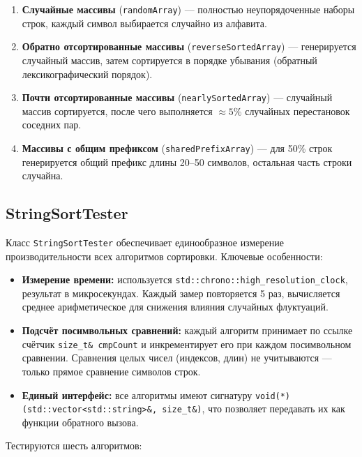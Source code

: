 \documentclass[12pt,a4paper]{article}
\begin{document}
\begin{enumerate}
    \item \textbf{Случайные массивы} (\texttt{randomArray}) — полностью неупорядоченные наборы строк, каждый символ выбирается случайно из алфавита.
    \item \textbf{Обратно отсортированные массивы} (\texttt{reverseSortedArray}) — генерируется случайный массив, затем сортируется в порядке убывания (обратный лексикографический порядок).
    \item \textbf{Почти отсортированные массивы} (\texttt{nearlySortedArray}) — случайный массив сортируется, после чего выполняется $\approx 5\%$ случайных перестановок соседних пар.
    \item \textbf{Массивы с общим префиксом} (\texttt{sharedPrefixArray}) — для 50\% строк генерируется общий префикс длины 20--50 символов, остальная часть строки случайна.
\end{enumerate}

\subsection{StringSortTester}

Класс \texttt{StringSortTester} обеспечивает единообразное измерение производительности всех алгоритмов сортировки. Ключевые особенности:

\begin{itemize}
    \item \textbf{Измерение времени:} используется \texttt{std::chrono::high\_resolution\_clock}, результат в микросекундах. Каждый замер повторяется 5 раз, вычисляется среднее арифметическое для снижения влияния случайных флуктуаций.
    \item \textbf{Подсчёт посимвольных сравнений:} каждый алгоритм принимает по ссылке счётчик \texttt{size\_t\& cmpCount} и инкрементирует его при каждом посимвольном сравнении. Сравнения целых чисел (индексов, длин) не учитываются — только прямое сравнение символов строк.
    \item \textbf{Единый интерфейс:} все алгоритмы имеют сигнатуру \texttt{void(*)(std::vector<std::string>\&, size\_t\&)}, что позволяет передавать их как функции обратного вызова.
\end{itemize}

Тестируются шесть алгоритмов:
\end{document}
